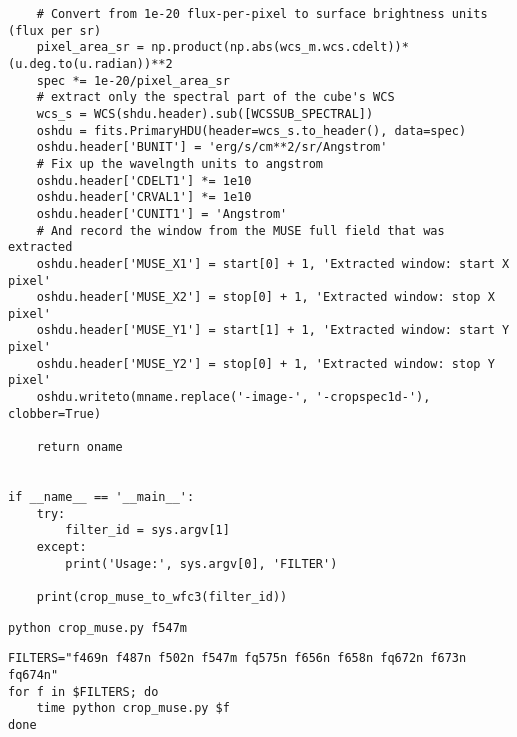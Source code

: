 \documentclass[11pt]{article}
\begin{document}
\begin{verbatim}
    # Convert from 1e-20 flux-per-pixel to surface brightness units (flux per sr)
    pixel_area_sr = np.product(np.abs(wcs_m.wcs.cdelt))*(u.deg.to(u.radian))**2
    spec *= 1e-20/pixel_area_sr
    # extract only the spectral part of the cube's WCS
    wcs_s = WCS(shdu.header).sub([WCSSUB_SPECTRAL])
    oshdu = fits.PrimaryHDU(header=wcs_s.to_header(), data=spec)
    oshdu.header['BUNIT'] = 'erg/s/cm**2/sr/Angstrom'
    # Fix up the wavelngth units to angstrom
    oshdu.header['CDELT1'] *= 1e10
    oshdu.header['CRVAL1'] *= 1e10
    oshdu.header['CUNIT1'] = 'Angstrom'
    # And record the window from the MUSE full field that was extracted
    oshdu.header['MUSE_X1'] = start[0] + 1, 'Extracted window: start X pixel' 
    oshdu.header['MUSE_X2'] = stop[0] + 1, 'Extracted window: stop X pixel' 
    oshdu.header['MUSE_Y1'] = start[1] + 1, 'Extracted window: start Y pixel' 
    oshdu.header['MUSE_Y2'] = stop[0] + 1, 'Extracted window: stop Y pixel' 
    oshdu.writeto(mname.replace('-image-', '-cropspec1d-'), clobber=True)

    return oname


if __name__ == '__main__':
    try:
        filter_id = sys.argv[1]
    except:
        print('Usage:', sys.argv[0], 'FILTER')

    print(crop_muse_to_wfc3(filter_id))
\end{verbatim}

\begin{verbatim}
python crop_muse.py f547m
\end{verbatim}

\begin{verbatim}
FILTERS="f469n f487n f502n f547m fq575n f656n f658n fq672n f673n fq674n"
for f in $FILTERS; do
    time python crop_muse.py $f
done
\end{verbatim}
\end{document}
